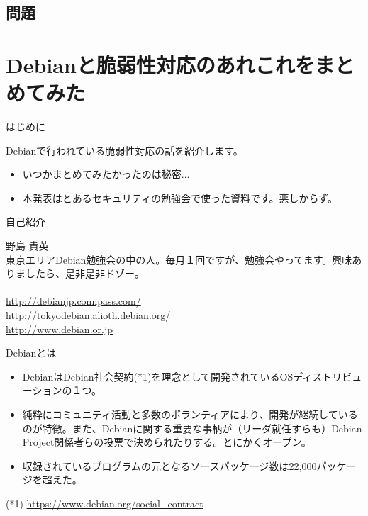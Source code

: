 \subsection{問題}



\section{Debianと脆弱性対応のあれこれをまとめてみた}

\begin{frame}{はじめに}

  Debianで行われている脆弱性対応の話を紹介します。

\begin{itemize}
\item いつかまとめてみたかったのは秘密...
\item 本発表はとあるセキュリティの勉強会で使った資料です。悪しからず。
\end{itemize}

\end{frame}

\begin{frame}{自己紹介}

野島 貴英\\
東京エリアDebian勉強会の中の人。毎月１回ですが、勉強会やってます。興味ありましたら、是非是非ドゾー。\\
\ \\
\url{http://debianjp.connpass.com/} \\
\url{http://tokyodebian.alioth.debian.org/}\\
\url{http://www.debian.or.jp} 

\end{frame}  

\begin{frame}{Debianとは}

 \begin{itemize}
 \item  DebianはDebian社会契約(*1)を理念として開発されているOSディストリビューションの１つ。
 \item 純粋にコミュニティ活動と多数のボランティアにより、開発が継続しているのが特徴。また、Debianに関する重要な事柄が（リーダ就任すらも）Debian Project関係者らの投票で決められたりする。とにかくオープン。

 \item 収録されているプログラムの元となるソースパッケージ数は22,000パッケージを超えた。
 \end{itemize}

(*1) \url{https://www.debian.org/social_contract}
 
\end{frame}


